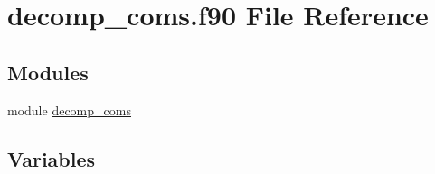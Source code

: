 \hypertarget{decomp__coms_8f90}{}\section{decomp\+\_\+coms.\+f90 File Reference}
\label{decomp__coms_8f90}
\subsection*{Modules}
\begin{DoxyCompactItemize}
\item 
module \hyperlink{namespacedecomp__coms}{decomp\+\_\+coms}
\end{DoxyCompactItemize}
\subsection*{Variables}

